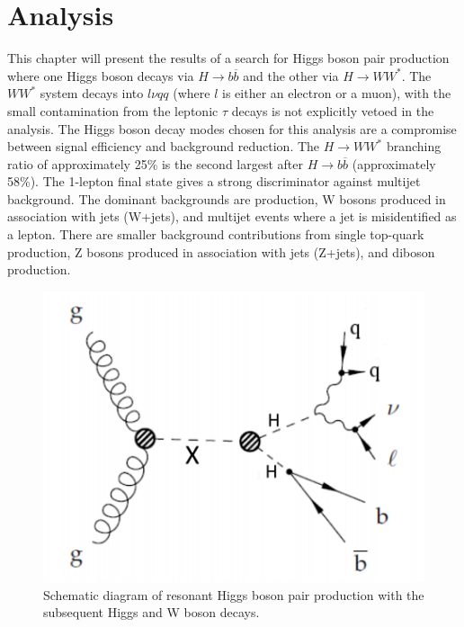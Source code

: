 \chapter{Analysis}
This chapter will present the results of a search for Higgs boson pair production where one Higgs boson decays via ${H\rightarrow b\overline{b}}$ and the other via ${H\rightarrow WW^{*}}$. The ${WW^{*}}$ system decays into ${l\nu qq}$ (where ${l}$ is either an electron or a muon), with the small contamination from the leptonic ${\tau}$ decays is not explicitly vetoed in the analysis. The Higgs boson decay modes chosen for this analysis are a compromise between signal efficiency and background reduction. The ${H\rightarrow WW^{*}}$ branching ratio of approximately 25\% is the second largest after ${H\rightarrow b\overline{b}}$ (approximately 58\%). The 1-lepton final state gives a strong discriminator against multijet background. The dominant backgrounds are \ttbar{} production, W bosons produced in association with jets (W+jets), and multijet events where a jet is misidentified as a lepton. There are smaller background  contributions from single top-quark production, Z bosons produced in association with jets (Z+jets), and diboson production.\newline

\begin{figure}[h]
\begin{center}
\includegraphics[scale=0.65]{figures/res_prod}
\caption{Schematic diagram of resonant Higgs boson pair production with the subsequent Higgs and W boson
decays.}
\end{center}
\label{fig:res}
\end{figure}

